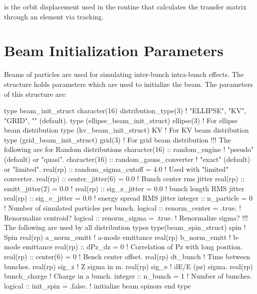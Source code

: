  is the orbit displacement used in the routine that
calculates the transfer matrix through an element via tracking.

\section{Beam Initialization Parameters}
\label{s:beam.init}

Beams of particles are used for simulating inter-bunch intra-bunch effects.
The  structure holds parameters which are used to initialize
the beam. The parameters of this structure are:
\begin{example}
  type beam_init_struct
    character(16) distribution_type(3)         ! "ELLIPSE", "KV", "GRID", "" (default).
    type (ellipse_beam_init_struct) ellipse(3) ! For ellipse beam distribution
    type (kv_beam_init_struct) KV              ! For KV beam distribution
    type (grid_beam_init_struct) grid(3)       ! For grid beam distribution
    !!! The following are for Random distributions
    character(16) :: random_engine          ! "pseudo" (default) or "quasi". 
    character(16) :: random_gauss_converter ! "exact" (default) or "limited". 
    real(rp) :: random_sigma_cutoff = 4.0   ! Used with "limited" converter. 
    real(rp) :: center_jitter(6) = 0.0  ! Bunch center rms jitter
    real(rp) :: emitt_jitter(2)  = 0.0  ! %
    real(rp) :: sig_z_jitter     = 0.0  ! bunch length RMS jitter 
    real(rp) :: sig_e_jitter     = 0.0  ! energy spread RMS jitter 
    integer :: n_particle = 0           ! Number of simulated particles per bunch.
    logical :: renorm_center = .true.   ! Renormalize centroid?
    logical :: renorm_sigma = .true.    ! Renormalize sigma?
    !!! The following are used  by all distribution types
    type(beam_spin_struct)  spin        ! Spin
    real(rp) a_norm_emitt               ! a-mode emittance
    real(rp) b_norm_emitt               ! b-mode emittance
    real(rp) :: dPz_dz = 0              ! Correlation of Pz with long position.
    real(rp) :: center(6) = 0           ! Bench center offset.
    real(rp) dt_bunch                   ! Time between bunches.
    real(rp) sig_z                      ! Z sigma in m.
    real(rp) sig_e                      ! dE/E (pz) sigma.
    real(rp) bunch_charge               ! Charge in a bunch.
    integer :: n_bunch = 1              ! Number of bunches.
    logical :: init_spin     = .false.  ! initialize beam spinors
  end type
\end{example}
